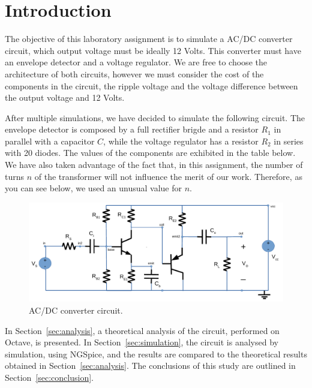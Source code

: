 \section{Introduction}
\label{sec:introduction}
The objective of this laboratory assignment is to simulate a AC/DC converter circuit, which output voltage must be ideally 12 Volts. 
This converter must have an envelope detector and a voltage regulator. We are free to choose the architecture of both circuits, 
however we must consider the cost of the components in the circuit, the ripple voltage and the voltage difference between the output 
voltage and 12 Volts.

After multiple simulations, we have decided to simulate the following circuit. The envelope detector is composed by
a full rectifier brigde and a resistor $R_1$ in parallel with a capacitor $C$, while the voltage regulator has a resistor $R_2$ in
series with 20 diodes. The values of the components are exhibited in the table below. We have also taken advantage of the fact that,
in this assignment, the number of turns $n$ of the transformer will not influence the merit of our work. Therefore, as you can see below,
we used an unusual value for $n$.

\begin{figure}[H] \centering
\includegraphics[width=0.8\linewidth]{circuit.pdf}
\caption{AC/DC converter circuit.}                                     
\label{fig:circuit}
\end{figure}

%    


In Section~\ref{sec:analysis}, a theoretical analysis of the circuit, 
performed on Octave, is presented. In Section~\ref{sec:simulation}, the 
circuit is analysed by simulation, using NGSpice, and the results are compared to 
the theoretical results obtained in Section~\ref{sec:analysis}. The conclusions 
of this study are outlined in Section~\ref{sec:conclusion}.


